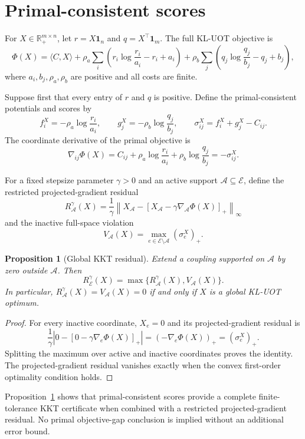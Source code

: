\documentclass[11pt]{article}
\newtheorem{proposition}{Proposition}
\newcommand{\R}{\mathbb{R}}
\begin{document}
\section{Primal-consistent scores}

For $X\in\R_+^{m\times n}$, let $r=X\mathbf 1_n$ and $q=X^\top\mathbf 1_m$.
The full KL-UOT objective is
$$\Phi(X)=\langle C,X\rangle+\rho_a\sum_i\left(r_i\log\frac{r_i}{a_i}-r_i+a_i\right)+\rho_b\sum_j\left(q_j\log\frac{q_j}{b_j}-q_j+b_j\right),$$
where $a_i,b_j,\rho_a,\rho_b$ are positive and all costs are finite.

Suppose first that every entry of $r$ and $q$ is positive.
Define the primal-consistent potentials and scores by
$$f_i^X=-\rho_a\log\frac{r_i}{a_i},\qquad g_j^X=-\rho_b\log\frac{q_j}{b_j},\qquad \sigma_{ij}^X=f_i^X+g_j^X-C_{ij}.$$
The coordinate derivative of the primal objective is
$$\nabla_{ij}\Phi(X)=C_{ij}+\rho_a\log\frac{r_i}{a_i}+\rho_b\log\frac{q_j}{b_j}=-\sigma_{ij}^X.$$

For a fixed stepsize parameter $\gamma>0$ and an active support $\mathcal A\subseteq\mathcal E$, define the restricted projected-gradient residual
$$R_{\mathcal A}^{\gamma}(X)=\frac{1}{\gamma}\left\|X_{\mathcal A}-\left[X_{\mathcal A}-\gamma\nabla_{\mathcal A}\Phi(X)\right]_+\right\|_{\infty}$$
and the inactive full-space violation
$$V_{\mathcal A}(X)=\max_{e\in\mathcal E\setminus\mathcal A}(\sigma_e^X)_+.$$

\begin{proposition}[Global KKT residual]\label{prop:global-kkt}
Extend a coupling supported on $\mathcal A$ by zero outside $\mathcal A$.
Then
$$R_{\mathcal E}^{\gamma}(X)=\max\{R_{\mathcal A}^{\gamma}(X),V_{\mathcal A}(X)\}.$$
In particular, $R_{\mathcal A}^{\gamma}(X)=V_{\mathcal A}(X)=0$ if and only if $X$ is a global KL-UOT optimum.
\end{proposition}

\begin{proof}
For every inactive coordinate, $X_e=0$ and its projected-gradient residual is
$$\frac{1}{\gamma}\left|0-[0-\gamma\nabla_e\Phi(X)]_+\right|=(-\nabla_e\Phi(X))_+=(\sigma_e^X)_+.$$
Splitting the maximum over active and inactive coordinates proves the identity.
The projected-gradient residual vanishes exactly when the convex first-order optimality condition holds.
\end{proof}

Proposition~\ref{prop:global-kkt} shows that primal-consistent scores provide a complete finite-tolerance KKT certificate when combined with a restricted projected-gradient residual.
No primal objective-gap conclusion is implied without an additional error bound.
\end{document}
